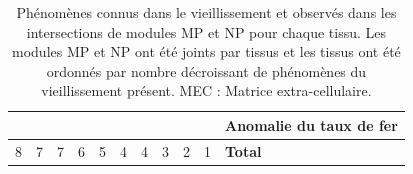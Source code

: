 \begin{table}[]
{\begin{tabular}{@{}lllllllllll@{}}
\cellcolor[HTML]{F8A102} & \cellcolor[HTML]{F8A102}            & \cellcolor[HTML]{F8A102} & \cellcolor[HTML]{F8A102} &                          &                          &                          &                            &                          &                          & Anomalie du taux de fer                   \\
\midrule
8                        & 7                                   & 7                        & 6                        & 5                        & 4                        & 4                        & 3                          & 2                        & 1                        & \textbf{Total}                   
\end{tabular}
}
\caption{Phénomènes connus dans le vieillissement et observés dans les intersections de modules MP et NP pour chaque tissu. Les modules MP et NP ont été joints par tissus et les tissus ont été ordonnés par nombre décroissant de phénomènes du vieillissement présent. MEC : Matrice extra-cellulaire.}
\label{table:intersection_aging_global_phenomenons}
\end{table}

